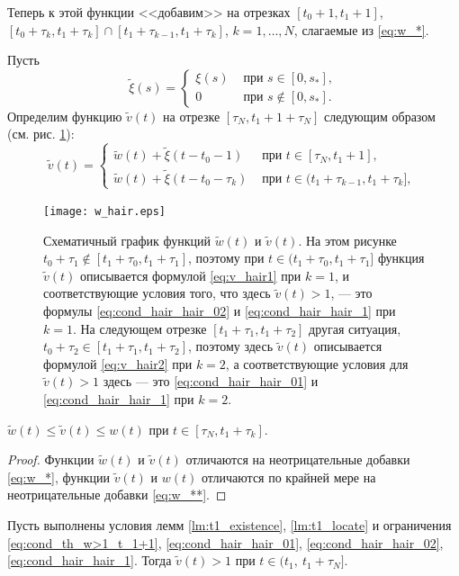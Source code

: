 Теперь к этой функции <<добавим>> на отрезках $[t_0+1,t_1+1]$, $[t_0+\tau_k, t_1+\tau_k]\cap[t_1+\tau_{k-1},t_1+\tau_k]$, $k=1,\ldots,N$, слагаемые из \eqref{eq:w_*}.

Пусть
%
\[
\tilde{\xi}(s) = 
\begin{cases}
	\xi(s) & \text{ при } s\in[0,s_*],\\
	0 & \text{ при } s\notin[0,s_*].
\end{cases}
\]
%
Определим функцию $\tilde{v}(t)$ на отрезке $[\tau_N,t_1+1+\tau_N]$ следующим образом (см. рис. \ref{fig:w_hair}):
%
\[
\tilde{v}(t) =
\begin{cases}
	\tilde{w}(t)+\tilde{\xi}(t-t_0-1)& \text{ при } t\in[\tau_{N}, t_1 + 1],\\
	\tilde{w}(t)+\tilde{\xi}(t-t_0-\tau_k)& \text{ при } t\in(t_1 + \tau_{k-1}, t_1 + \tau_k],\
\end{cases}
\]
%
%
\begin{figure}
	\centering
	\texttt{[image: w\_hair.eps]}
	\caption{Схематичный график функций $\tilde{w}(t)$ и $\tilde{v}(t)$. На этом рисунке $t_0+\tau_1 \notin[t_1+\tau_0,t_1+\tau_1]$, поэтому при $t\in(t_1+\tau_0,t_1+\tau_1]$ функция  $\tilde{v}(t)$ описывается формулой \eqref{eq:v_hair1} при $k=1$, и соответствующие условия того, что здесь $\tilde{v}(t)>1$, --- это формулы \eqref{eq:cond_hair_hair_02} и \eqref{eq:cond_hair_hair_1} при $k=1$. На следующем отрезке $[t_1+\tau_1,t_1+\tau_2]$ другая ситуация,  $t_0+\tau_2\in[t_1+\tau_1,t_1+\tau_2]$, поэтому здесь $\tilde{v}(t)$ описывается формулой \eqref{eq:v_hair2} при $k=2$, а соответствующие условия для $\tilde{v}(t)>1$ здесь --- это \eqref{eq:cond_hair_hair_01} и \eqref{eq:cond_hair_hair_1} при $k=2$. }
	\label{fig:w_hair}
\end{figure}
%

%
\begin{proposition}
	\label{prop:w_w_hair}
	$\tilde{w}(t)\leqslant\tilde{v}(t)\leqslant w(t)$ при $t\in[\tau_N,t_1+\tau_k]$.
\end{proposition}
\begin{proof}
	Функции $\tilde{w}(t)$ и $\tilde{v}(t)$ отличаются на неотрицательные добавки \eqref{eq:w_*}, функции $\tilde{v}(t)$ и $w(t)$ отличаются по крайней мере на неотрицательные добавки \eqref{eq:w_**}.
\end{proof}

\begin{proposition}
	\label{prop:v_hair>1}
	Пусть выполнены условия лемм \ref{lm:t1_existence}, \ref{lm:t1_locate} и ограничения \eqref{eq:cond_th_w>1_t_1+1}, \eqref{eq:cond_hair_hair_01}, \eqref{eq:cond_hair_hair_02}, \eqref{eq:cond_hair_hair_1}. Тогда 
	$\tilde{v}(t)>1$ при $t\in(t_1,\ t_1+\tau_N]$.
\end{proposition}

